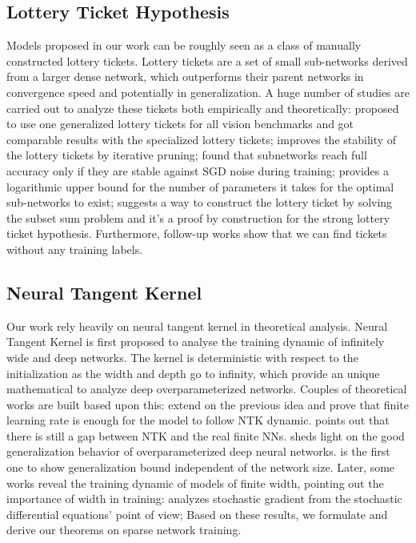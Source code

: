\subsection{Lottery Ticket Hypothesis} 
Models proposed in our work can be roughly seen as a class of manually constructed lottery tickets. Lottery tickets \citet{frankle2018lottery} are a set of small sub-networks derived from a larger dense network, which outperforms their parent networks in convergence speed and potentially in generalization. A huge number of studies are carried out to analyze these tickets both empirically and theoretically: \citet{morcos2019one} proposed to use one generalized lottery tickets for all vision benchmarks and got comparable results with the specialized lottery tickets; \citet{frankle2019stabilizing} improves the stability of the lottery tickets by iterative pruning; \citet{frankle2020linear} found that subnetworks reach full accuracy only if they are stable against SGD noise during training; \citet{orseau2020logarithmic} provides a logarithmic upper bound for the number of parameters it takes for the optimal sub-networks to exist; \citet{pensia2020optimal} suggests a way to construct the lottery ticket by solving the subset sum problem and it's a proof by construction for the strong lottery ticket hypothesis. Furthermore, follow-up works \citep{liu2020finding, wang2020picking, tanaka2020pruning} show that we can find tickets without any training labels.\\

\subsection{Neural Tangent Kernel} 

Our work rely heavily on neural tangent kernel in theoretical analysis. Neural Tangent Kernel \citet{jacot2018neural} is first proposed to analyse the training dynamic of infinitely wide and deep networks. The kernel is deterministic with respect to the initialization as the width and depth go to infinity, which provide an unique mathematical to analyze deep overparameterized networks. Couples of theoretical works are built based upon this: \cite{lee2019wide} extend on the previous idea and prove that finite learning rate is enough for the model to follow NTK dynamic. \citet{arora2019exact} points out that there is still a gap between NTK and the real finite NNs. \citet{cao2020generalization} sheds light on  the good generalization behavior of overparameterized deep neural networks. \citet{arora2019fine} is the first one to show generalization bound independent of the network size. Later, some works reveal the training dynamic of models of finite width, pointing out the importance of width in training: \citet{hayou2019training} analyzes stochastic gradient from the stochastic differential equations' point of view; Based on these results, we formulate and derive our theorems on sparse network training.\\

